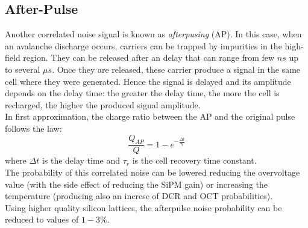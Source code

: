 \subsection{After-Pulse}
Another correlated noise signal is known as \textit{afterpusing} (AP). In this case, when an avalanche discharge occurs, carriers can be trapped by impurities in the high-field region. They can be released after an delay that can range from few $ns$ up to several $\mu s$. Once they are released, these carrier produce a signal in the same cell where they were generated. Hence the signal is delayed and its amplitude depends on the delay time: the greater the delay time, the more the cell is recharged, the higher the produced signal amplitude.\\
In first approximation, the charge ratio between the AP and the original pulse follows the law:
\begin{equation}
    \frac{Q_{AP}}{Q} = 1 - e^{-\frac{\Delta t}{\tau_r}}
\end{equation}
where $\Delta t$ is the delay time and $\tau_r$ is the cell recovery time constant.\\
The probability of this correlated noise can be lowered reducing the overvoltage value (with the side effect of reducing the SiPM gain) or increasing the temperature (producing also an increse of DCR and OCT probabilities).\\ 
Using higher quality silicon lattices, the afterpulse noise probability can be reduced to values of $1-3\%$.\\
